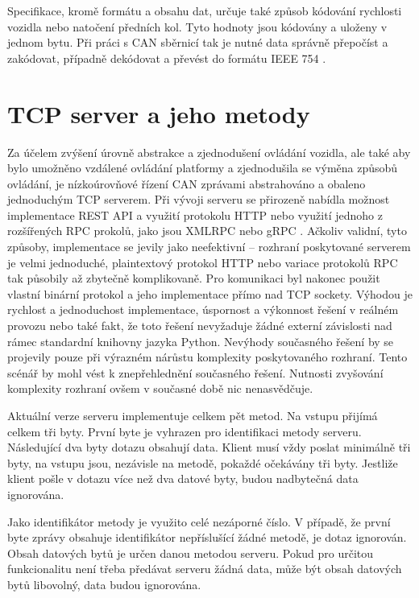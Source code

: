 \documentclass[czech, bachelor]{diploma}
\begin{document}
Specifikace, kromě formátu a obsahu dat, určuje také způsob kódování rychlosti vozidla nebo natočení předních kol. Tyto hodnoty
jsou kódovány a uloženy v jednom bytu. Při práci s CAN sběrnicí tak je nutné data správně přepočíst a zakódovat, případně
dekódovat a převést do formátu IEEE 754 \cite{floating-point-source}.

\section{TCP server a jeho metody} \label{server-methods}

Za účelem zvýšení úrovně abstrakce a zjednodušení ovládání vozidla, ale také aby bylo umožněno vzdálené ovládání platformy
a zjednodušila se výměna způsobů ovládání, je nízkoúrovňové řízení CAN zprávami abstrahováno a obaleno jednoduchým TCP serverem.
Při vývoji serveru se přirozeně nabídla možnost implementace REST API \cite{rest-source} a využití protokolu HTTP 
\cite{http-source} nebo využití jednoho z rozšířených RPC prokolů, jako jsou XMLRPC \cite{xmlrpc-source} nebo gRPC 
\cite{grpc-source}. Ačkoliv validní, tyto způsoby, implementace se jevily jako neefektivní -- rozhraní poskytované serverem je
velmi jednoduché, plaintextový protokol HTTP nebo variace protokolů RPC tak působily až zbytečně komplikovaně. Pro komunikaci byl
nakonec použit vlastní binární protokol a jeho implementace přímo nad TCP sockety. Výhodou je rychlost a jednoduchost
implementace, úspornost a výkonnost řešení v reálném provozu nebo také fakt, že toto řešení nevyžaduje žádné externí závislosti
nad rámec standardní knihovny jazyka Python. Nevýhody současného řešení by se projevily pouze při výrazném nárůstu komplexity
poskytovaného rozhraní. Tento scénář by mohl vést k znepřehlednění současného řešení. Nutnosti zvyšování komplexity rozhraní ovšem
v současné době nic nenasvědčuje.

Aktuální verze serveru implementuje celkem pět metod. Na vstupu přijímá celkem tři byty. První byte je vyhrazen pro identifikaci
metody serveru. Následující dva byty dotazu obsahují data. Klient musí vždy poslat minimálně tři byty, na vstupu jsou, nezávisle
na metodě, pokaždé očekávány tři byty. Jestliže klient pošle v dotazu více než dva datové byty, budou nadbytečná data ignorována.

Jako identifikátor metody je využito celé nezáporné číslo. V případě, že první byte zprávy obsahuje identifikátor nepříslušící
žádné metodě, je dotaz ignorován. Obsah datových bytů je určen danou metodou serveru. Pokud pro určitou funkcionalitu není třeba
předávat serveru žádná data, může být obsah datových bytů libovolný, data budou ignorována.
\end{document}
